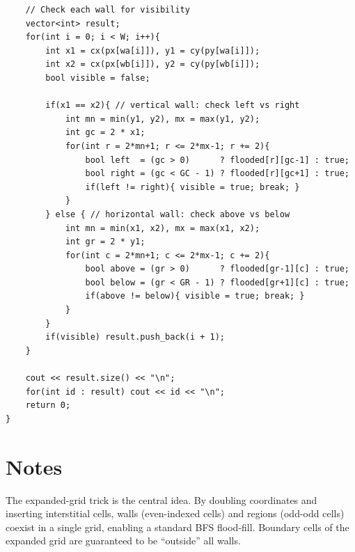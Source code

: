 \documentclass[11pt,a4paper]{article}
\begin{document}
\begin{lstlisting}
    // Check each wall for visibility
    vector<int> result;
    for(int i = 0; i < W; i++){
        int x1 = cx(px[wa[i]]), y1 = cy(py[wa[i]]);
        int x2 = cx(px[wb[i]]), y2 = cy(py[wb[i]]);
        bool visible = false;

        if(x1 == x2){ // vertical wall: check left vs right
            int mn = min(y1, y2), mx = max(y1, y2);
            int gc = 2 * x1;
            for(int r = 2*mn+1; r <= 2*mx-1; r += 2){
                bool left  = (gc > 0)      ? flooded[r][gc-1] : true;
                bool right = (gc < GC - 1) ? flooded[r][gc+1] : true;
                if(left != right){ visible = true; break; }
            }
        } else { // horizontal wall: check above vs below
            int mn = min(x1, x2), mx = max(x1, x2);
            int gr = 2 * y1;
            for(int c = 2*mn+1; c <= 2*mx-1; c += 2){
                bool above = (gr > 0)      ? flooded[gr-1][c] : true;
                bool below = (gr < GR - 1) ? flooded[gr+1][c] : true;
                if(above != below){ visible = true; break; }
            }
        }
        if(visible) result.push_back(i + 1);
    }

    cout << result.size() << "\n";
    for(int id : result) cout << id << "\n";
    return 0;
}
\end{lstlisting}

\section{Notes}
The expanded-grid trick is the central idea. By doubling coordinates and inserting interstitial cells, walls (even-indexed cells) and regions (odd-odd cells) coexist in a single grid, enabling a standard BFS flood-fill. Boundary cells of the expanded grid are guaranteed to be ``outside'' all walls.
\end{document}
